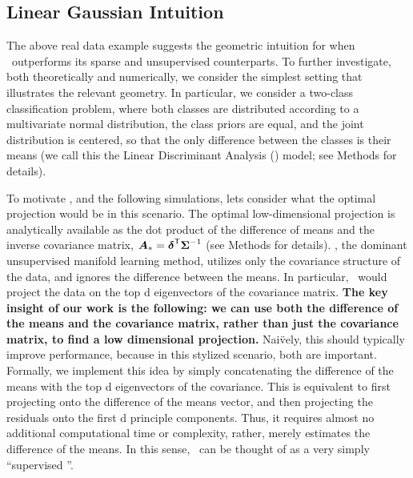 \documentclass[10pt]{article}
\begin{document}
\subsection*{Linear Gaussian Intuition}

The above real data example suggests the geometric intuition for when \Lol~outperforms its sparse and unsupervised counterparts.  To further investigate, both theoretically and numerically, we consider the simplest setting that illustrates the relevant geometry.  In particular, we consider a two-class classification problem, where both classes are distributed according to a multivariate normal distribution, the class priors are equal, and the joint distribution is centered, so that the only difference between the classes is their means (we call this the Linear Discriminant Analysis (\Lda) model; see Methods for details).  




To motivate \Lol, and the following simulations, lets consider what the optimal projection would be in this scenario. The optimal low-dimensional projection is analytically available as the dot product of the difference of means and the inverse covariance matrix, $\boldsymbol{A}_*=\boldsymbol{\delta}^{\mathsf{T}} \boldsymbol{\Sigma}^{-1}$ \cite{Bickel2004a} (see Methods for details).  
\Pca, the dominant unsupervised manifold learning method, utilizes only the covariance structure of the data, and ignores the difference between the means.  
In particular, \Pca~would project the data on the top d eigenvectors of the  covariance matrix.
\textbf{The key insight of our work is the following: we can use both the difference of the means and the covariance matrix, rather than just the covariance matrix, to find a low dimensional projection.}  
Nai\"vely, this should typically improve performance, because in this stylized scenario, both are important.  Formally, we implement this idea by simply concatenating the difference of the means with the top d eigenvectors of the  covariance. 
This is equivalent to first projecting onto the difference of the means vector, and then projecting the residuals onto the first d principle components. 
Thus, it requires almost no additional computational time or complexity, rather, merely estimates the difference of the means.  
In this sense, \Lol~can be thought of as a very simply  ``supervised \Pca''.  
\end{document}
